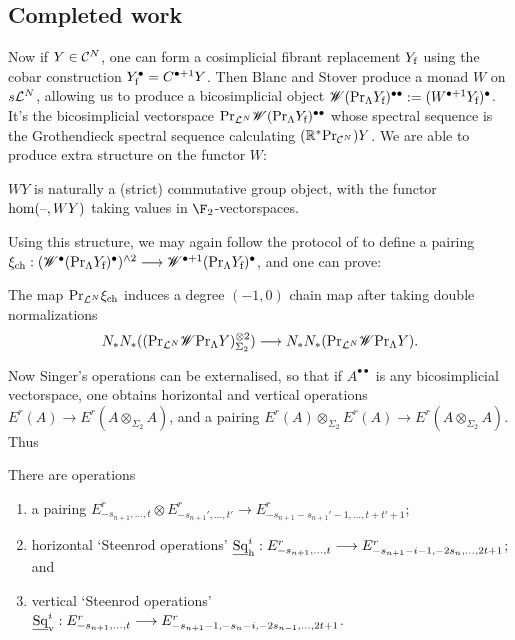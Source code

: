 \documentclass[11pt]{article}
\newcommand{\Sq}{\mathrm{Sq}}
\begin{document}
\subsection{Completed work}
Now if $Y\in\mathcal{C}^N$, one can form a cosimplicial fibrant replacement $Y_\textup{f}$ using the cobar construction $Y_\textup{f}^\bullet=C^{\bullet+1}Y$. Then Blanc and Stover produce a monad $W$ on $s\mathcal{L}^N$, allowing us to produce a bicosimplicial object $\mathscr{W}(\textup{Pr}_{\Lambda}Y_\textup{f})^{\bullet\bullet}:= (W^{\bullet+1}Y_\textup{f})^\bullet$. It's the bicosimplicial vectorspace $\textup{Pr}_{\mathcal{L}^N} \mathscr{W}(\textup{Pr}_{\Lambda}Y_\textup{f})^{\bullet\bullet}$ whose spectral sequence is the Grothendieck spectral sequence calculating $(\mathbb{R}^*\textup{Pr}_{\mathcal{C}^N})Y$. We are able to produce extra structure on the functor $W$:
\begin{prop}
$WY$ is naturally a (strict) commutative group object, with the functor $\hom(\textup{--},WY)$ taking values in $\ensuremath{\F_2}$-vectorspaces.
\end{prop}
Using this structure, we may again follow the protocol of \cite[\S5]{MR1089001} to define a pairing $\xi_\textup{ch}:(\mathscr{W}^{\bullet} (\textup{Pr}_\Lambda Y_\textup{f})^\bullet)^{\wedge 2}\longrightarrow \mathscr{W}^{\bullet+1} (\textup{Pr}_\Lambda Y_\textup{f})^\bullet$, and one can prove:
\begin{prop}
The map $\textup{Pr}_{\mathcal{L}^N}\xi_\textup{ch}$ induces a degree $(-1,0)$ chain map after taking double normalizations
\[ N_*N_*((\textup{Pr}_{\mathcal{L}^N}\mathscr{W}\textup{Pr}_\Lambda Y)^{\otimes2}_{\Sigma_2})\longrightarrow N_*N_*(\textup{Pr}_{\mathcal{L}^N}\mathscr{W}\textup{Pr}_\Lambda Y).\]
\end{prop}
Now Singer's operations can be externalised, so that if $A^{\bullet\bullet}$ is any bicosimplicial vectorspace, one obtains horizontal and vertical operations $E^r(A)\to E^r(A\otimes_{\Sigma_2}A)$, and a pairing $E^r(A)\otimes_{\Sigma_2}E^r(A)\to E^r(A\otimes_{\Sigma_2}A)$. Thus
\begin{cor}\label{opns-on-whole-gss}
There are operations
\begin{enumerate}\squishlist
\setlength{\parindent}{.25in}
\item a pairing $E^r_{-s_{n+1},\ldots,t}\otimes E^r_{-s_{n+1}',\ldots,t'}\to E^r_{-s_{n+1}-s_{n+1}'-1,\ldots,t+t'+1}$;
\item horizontal `Steenrod operations' $\underline{\Sq}^i_\textup{h}:E^r_{-s_{n+1},\ldots,t}\to E^r_{-s_{n+1}-i-1,-2s_{n},\ldots,2t+1}$; and
\item vertical `Steenrod operations' $\underline{\Sq}^i_\textup{v}:E^r_{-s_{n+1},\ldots,t}\to E^r_{-s_{n+1}-1,-s_{n}-i,-2s_{n-1},\ldots,2t+1}$.
\end{enumerate}
\end{cor}
\end{document}
